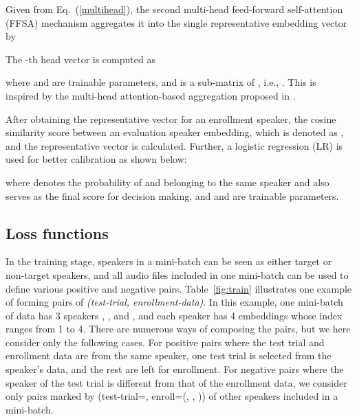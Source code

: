 \documentclass{article}
\newcommand{\PTrial}{}
\newcommand{\Nenroll}{}
\begin{document}
Given  from Eq.~(\ref{multihead}), the second multi-head feed-forward self-attention (FFSA) mechanism aggregates it into the single representative embedding vector  by 

The -th head vector  is computed as

where  and  are trainable parameters, and  is a sub-matrix of , i.e., .
This is inspired by the multi-head attention-based aggregation proposed in \cite{Lin2017-StructureATT}.

After obtaining the representative vector for an enrollment speaker, the cosine similarity score between an evaluation speaker embedding, which is denoted as , and the representative vector  is calculated. Further, a logistic regression (LR)  is used for better calibration as shown below:

where  denotes the probability of  and  belonging to the same speaker and also serves as the final score for decision making, and  and  are trainable parameters.
\vspace{-1mm}

































\subsection{Loss functions}
\vspace{-1mm}
\label{3.2}

In the training stage, speakers in a mini-batch can be seen as either target or non-target speakers, and all audio files included in one mini-batch can be used to define various positive and negative pairs.  Table~\ref{fig:train} illustrates one example of forming pairs of \textit{(test-trial, enrollment-data)}. In this example, one mini-batch of data has 3 speakers , , and , and each speaker has 4 embeddings whose index ranges from 1 to 4. 
There are numerous ways of composing the pairs, but we here consider only the following cases. 
For positive pairs where the test trial and enrollment data are from the same speaker, one test trial is selected from the speaker's data, and the rest are left for enrollment. 
For negative pairs where the speaker of the test trial is different from that of the enrollment data, we consider only pairs marked by (test-trial=\PTrial, enroll=(\Nenroll, \Nenroll, \Nenroll)) of other speakers included in a mini-batch. 
\end{document}
